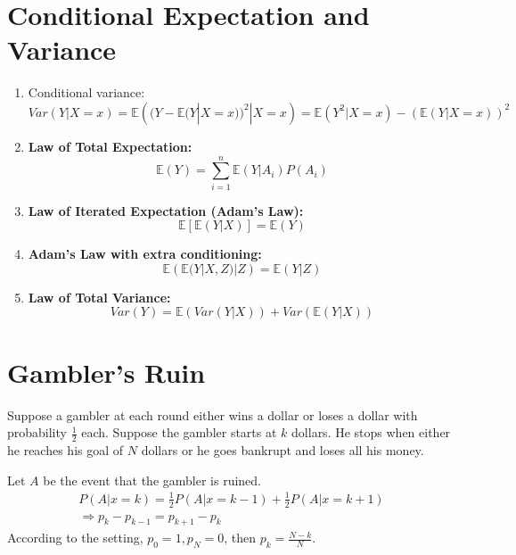 \documentclass[11pt]{elegantbook}
\begin{document}
\section{Conditional Expectation and Variance}
\begin{enumerate}[(1)]
    \item Conditional variance: $$Var(Y|X=x)=\mathbb{E}\left((Y-\mathbb{E}(Y|X=x))^2|X=x\right)
    =\mathbb{E}(Y^2|X=x)-(\mathbb{E}(Y|X=x))^2$$
    \item \textbf{Law of Total Expectation:} $$\mathbb{E}(Y)=\sum_{i=1}^n \mathbb{E}(Y|A_i)P(A_i)$$
    \item \textbf{Law of Iterated Expectation (Adam's Law):}
    $$\mathbb{E}\left[\mathbb{E}(Y|X)\right]=\mathbb{E}(Y)$$
    \item \textbf{Adam's Law with extra conditioning:} $$\mathbb{E}\left(\mathbb{E}(Y|X,Z)|Z\right)=\mathbb{E}(Y|Z)$$
    \item \textbf{Law of Total Variance:}$$Var(Y)=\mathbb{E}(Var(Y|X))+Var(\mathbb{E}(Y|X))$$
\end{enumerate}

\section{Gambler's Ruin}
Suppose a gambler at each round either wins a dollar or loses a dollar with probability $\frac{1}{2}$ each. Suppose the gambler starts at $k$ dollars. He stops when either he reaches his goal of $N$ dollars or he goes bankrupt and loses all his money.

Let $A$ be the event that the gambler is ruined.
\begin{equation}
    \begin{aligned}
        P(A|x=k)=\frac{1}{2}P(A|x=k-1)+\frac{1}{2}P(A|x=k+1)\\
        \Rightarrow p_k-p_{k-1}=p_{k+1}-p_k
    \end{aligned}
    \nonumber
\end{equation}
According to the setting, $p_0=1,p_N=0$, then $p_k=\frac{N-k}{N}$.
\end{document}
